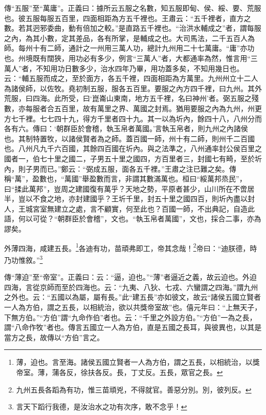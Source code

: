 {\noindent\zhuan{}\fzbyks 傳“五服”至“萬庸”。正義曰：據所云五服之名數，知五服即甸、侯、綏、要、荒服也。彼五服每服五百里，四面相距為方五千裡也。王肅云：“五千裡者，直方之數。若其迥邪委曲，動有倍加之較。”是直路五千裡也。“治洪水輔成之”者，謂每服之內，為其小數，定其差品，各有所掌，是輔成之也。大司馬法，二千五百人為師。每州十有二師，通計之一州用三萬人功，總計九州用二十七萬庸。“庸”亦功也。州境既有闊狹，用功必有多少，例言“三萬人”者，大都通率為然，惟言用“三萬人”者，不知用功日數多少，治水四年乃畢，用功蓋多矣，不知用幾日也。云：“輔五服而成之，至於面方，各五千裡，四面相距為方萬里。九州州立十二人為諸侯師，以佐牧。堯初制五服，服各五百里。要服之內方四千裡，曰九州。其外荒服，曰四海。此所受，曰‘崑崙山東南，地方五千裡，名曰神州’者。弼五服之殘數，亦每服者合五百里，故有萬里之界、萬國之封焉。猶用要服之內為九州，州更方七千裡。七七四十九，得方千里者四十九。其一以為圻內，餘四十八，八州分而各有六。傳曰：‘朝群臣於會稽，執玉帛者萬國。’言執玉帛者，則九州之內諸侯也。其制特置牧，以諸侯賢者為之師。蓋百國一師，州十有二師，則州千二百國也。八州凡九千六百國，其餘四百國在圻內。與之法準之，八州通率封公侯百里之國者一，伯七十里之國二，子男五十里之國四，方百里者三，封國七有畸，至於圻內，則子男而已。”鄭云：“弼成五服，面各五千裡。”王肅之注已難之矣。傳稱“萬”，盈數也，“萬國”舉盈數而言，非謂其數滿萬也。桓曰“綏萬邦烝民”，曰“揉此萬邦”，豈周之建國復有萬乎？天地之勢，平原者甚少，山川所在不啻居半，豈以不食之地，亦封建國乎？王圻千里，封五十里之國四百，則圻內盡以封人，王城宮室無建立之處，言不顧實，何至此也？百國一師，不出典記，自造此語，何以可從？“朝群臣於會稽”，文也。“執玉帛者萬國”，文也，採合二事，亦為謬矣。 \par}

外薄四海，咸建五長。\footnote{薄，迫也。言至海。諸侯五國立賢者一人為方伯，謂之五長，以相統治，以獎帝室。薄，蒲各反，徐扶各反。長，丁丈反。五長，眾官之長。}各迪有功，苗頑弗即工，帝其念哉！\footnote{九州五長各蹈為有功，惟三苗頑兇，不得就官。善惡分別。別，彼列反。}帝曰：“迪朕德，時乃功惟敘。”\footnote{言天下蹈行我德，是汝治水之功有次序，敢不念乎！}

{\noindent\zhuan{}\fzbyks 傳“薄迫”至“帝室”。正義曰：云：“逼，迫也。”“薄”者逼近之義，故云迫也。外迫四海，言從京師而至於四海也。云：“九夷、八狄、七戎、六蠻謂之四海。”謂九州之外也。云：“五國以為屬，屬有長。”此“建五長”亦如彼文，故云“諸侯五國立賢者一人為方伯，謂之五長，以相統治，欲以共獎帝室故”也。僖元年曰：“上無天子，下無方伯。”“方伯”謂“九命作伯”者也。云：“千里之外設方伯。”“方伯”一為之長，謂“八命作牧”者也。傳言五國立一人為方伯，直是五國之長耳，與彼異也，以其是當方之長，故傳以“方伯”言之。 \par}

